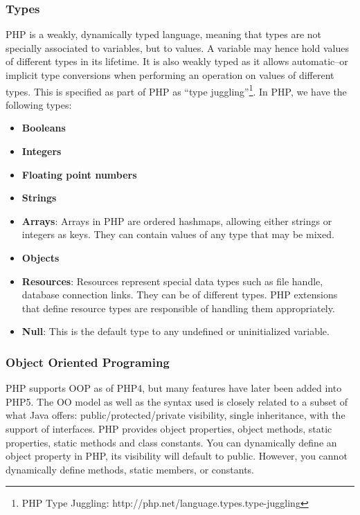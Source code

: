 \documentclass[a4paper]{article}
\begin{document}
\subsubsection{Types}
PHP is a weakly, dynamically typed language, meaning that types are not
specially associated to variables, but to values. A variable may hence hold
values of different types in its lifetime. It is also weakly typed as it allows
automatic--or implicit type conversions when performing an operation on values
of different types.  This is specified as part of PHP as ``type
juggling''\footnote{PHP Type Juggling:
http://php.net/language.types.type-juggling}. In PHP, we have the following
types:
\begin{itemize}
  \item \textbf{Booleans}
  \item \textbf{Integers}
  \item \textbf{Floating point numbers}
  \item \textbf{Strings}
  \item \textbf{Arrays}: Arrays in PHP are ordered hashmaps, allowing either
    strings or integers as keys.  They can contain values of any type that may
    be mixed.
  \item \textbf{Objects}
  \item \textbf{Resources}: Resources represent special data types such as file
    handle, database connection links. They can be of different types. PHP
    extensions that define resource types are responsible of handling them
    appropriately.
  \item \textbf{Null}: This is the default type to any undefined or
    uninitialized variable.
\end{itemize}

\subsubsection{Object Oriented Programing}
PHP supports OOP as of PHP4, but many features have later been added into PHP5.
The OO model as well as the syntax used is closely related to a subset of what
Java offers: public/protected/private visibility, single inheritance, with the
support of interfaces. PHP provides object properties, object methods, static
properties, static methods and class constants. You can dynamically define an
object property in PHP, its visibility will default to public. However, you
cannot dynamically define methods, static members, or constants.
\end{document}
